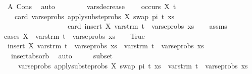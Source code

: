 \begin{isabellebody}
\ A\ Cons\ \isamarkupfalse%
\ auto\isanewline
\ \ \ \ \isamarkupfalse%
\isanewline
\ \ \isamarkupfalse%
\isanewline
{}\isamarkupfalse%
%
\endisatagproof
{\isafoldproof}%
%
\isadelimproof
\isanewline
%
\endisadelimproof
\isanewline
\isanewline
{}\isamarkupfalse%
\ vars{\isacharunderscore}{\kern0pt}decrease{\isacharcolon}{\kern0pt}\ \isanewline
\ \ \ {\isachardoublequoteopen}{\isasymnot}occurs\ X\ t{\isachardoublequoteclose}\isanewline
\ \ \ {\isachardoublequoteopen}card\ {\isacharparenleft}{\kern0pt}vars{\isacharunderscore}{\kern0pt}eprobs\ {\isacharparenleft}{\kern0pt}apply{\isacharunderscore}{\kern0pt}subst{\isacharunderscore}{\kern0pt}eprobs\ {\isacharbrackleft}{\kern0pt}{\isacharparenleft}{\kern0pt}X{\isacharcomma}{\kern0pt}\ swap\ pi\ t{\isacharparenright}{\kern0pt}{\isacharbrackright}{\kern0pt}\ xs{\isacharparenright}{\kern0pt}{\isacharparenright}{\kern0pt}\isanewline
\ \ \ \ \ \ \ \ \ \ \ \ \ \ \ \ \ {\isacharless}{\kern0pt}\ card\ {\isacharparenleft}{\kern0pt}insert\ X\ {\isacharparenleft}{\kern0pt}vars{\isacharunderscore}{\kern0pt}trm\ t\ {\isasymunion}\ vars{\isacharunderscore}{\kern0pt}eprobs\ xs{\isacharparenright}{\kern0pt}{\isacharparenright}{\kern0pt}{\isachardoublequoteclose}\isanewline
%
\isadelimproof
\ \ %
\endisadelimproof
%
\isatagproof
{}\isamarkupfalse%
\ assms\isanewline
{}\isamarkupfalse%
{\isacharparenleft}{\kern0pt}cases\ {\isachardoublequoteopen}X\ {\isasymin}\ {\isacharparenleft}{\kern0pt}vars{\isacharunderscore}{\kern0pt}trm\ t\ {\isasymunion}\ vars{\isacharunderscore}{\kern0pt}eprobs\ xs{\isacharparenright}{\kern0pt}{\isachardoublequoteclose}{\isacharparenright}{\kern0pt}\isanewline
\ \ \isamarkupfalse%
\ True\isanewline
\ \ \isamarkupfalse%
\ {\isachardoublequoteopen}insert\ X\ {\isacharparenleft}{\kern0pt}vars{\isacharunderscore}{\kern0pt}trm\ t\ {\isasymunion}\ vars{\isacharunderscore}{\kern0pt}eprobs\ xs{\isacharparenright}{\kern0pt}\ {\isacharequal}{\kern0pt}\ vars{\isacharunderscore}{\kern0pt}trm\ t\ {\isasymunion}\ vars{\isacharunderscore}{\kern0pt}eprobs\ xs{\isachardoublequoteclose}\isanewline
\ \ \ \ \isamarkupfalse%
\ \ insert{\isacharunderscore}{\kern0pt}absorb\ \isamarkupfalse%
\ auto\isanewline
\ \ \isamarkupfalse%
\ \isamarkupfalse%
\ subset{\isacharcolon}{\kern0pt}\isanewline
\ \ \ \ {\isachardoublequoteopen}vars{\isacharunderscore}{\kern0pt}eprobs\ {\isacharparenleft}{\kern0pt}apply{\isacharunderscore}{\kern0pt}subst{\isacharunderscore}{\kern0pt}eprobs\ {\isacharbrackleft}{\kern0pt}{\isacharparenleft}{\kern0pt}X{\isacharcomma}{\kern0pt}\ swap\ pi\ t{\isacharparenright}{\kern0pt}{\isacharbrackright}{\kern0pt}\ xs{\isacharparenright}{\kern0pt}\ {\isasymsubseteq}\ vars{\isacharunderscore}{\kern0pt}trm\ t\ {\isasymunion}\ vars{\isacharunderscore}{\kern0pt}eprobs\ xs{\isachardoublequoteclose}\isanewline

\end{isabellebody}
